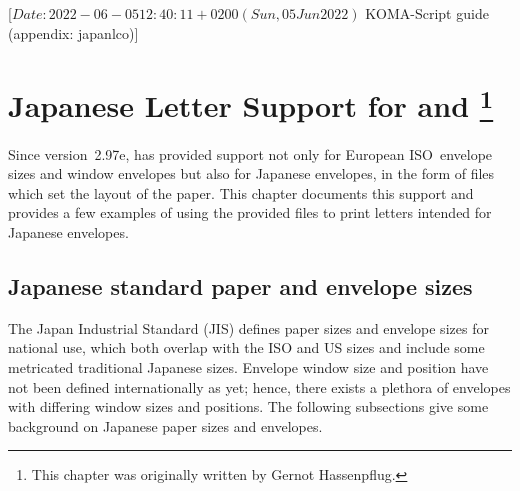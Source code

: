%
%
%
%
%
%
%
%
%

                 [$Date: 2022-06-05 12:40:11 +0200 (Sun, 05 Jun 2022) $
                  KOMA-Script guide (appendix: japanlco)]

\appendix

\chapter[{Japanese Letter Support for \Class{scrlttr2}} and \Package{scrletter}]
{Japanese Letter Support for  and \footnote{This chapter was
    originally written by Gernot Hassenpflug.}}
 

Since version~2.97e, \KOMAScript{} has provided support not only for
European ISO~envelope sizes and window envelopes but also for Japanese
envelopes, in the form of  files which set the layout of the paper.
This chapter documents this support and provides a few examples of using the
provided  files to print letters intended for Japanese envelopes.

\section{Japanese standard paper and envelope sizes}

The Japan Industrial Standard (JIS) defines paper sizes and envelope sizes for
national use, which both overlap with the ISO and US sizes and include some
metricated traditional Japanese sizes. Envelope window size and position have
not been defined internationally as yet; hence, there exists a plethora of
envelopes with differing window sizes and positions. The following subsections
give some background on Japanese paper sizes and envelopes.

